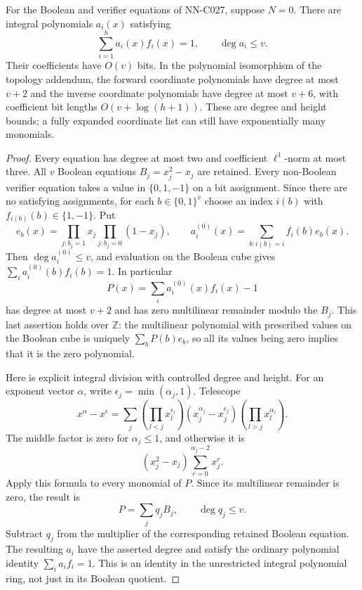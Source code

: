 \begin{proposition}
For the Boolean and verifier equations of NN-C027, suppose $N=0$.
There are integral polynomials $a_i(x)$ satisfying
\[
                      \sum_{i=1}^h a_i(x)f_i(x)=1,
 \qquad \deg a_i\leq v.
\]
Their coefficients have $O(v)$ bits. In the polynomial isomorphism
of the topology addendum, the forward coordinate polynomials have
degree at most $v+2$ and the inverse coordinate polynomials have
degree at most $v+6$, with coefficient bit lengths $O(v+\log(h+1))$.
These are degree and height bounds; a fully expanded coordinate
list can still have exponentially many monomials.
\end{proposition}

\begin{proof}
Every equation has degree at most two and coefficient $\ell^1$-norm
at most three. All $v$ Boolean equations $B_j=x_j^2-x_j$ are retained.
Every non-Boolean verifier equation takes a value in $\{0,1,-1\}$
on a bit assignment. Since there are no satisfying assignments,
for each $b\in\{0,1\}^v$ choose an index $i(b)$ with
$f_{i(b)}(b)\in\{1,-1\}$. Put
\[
 e_b(x)=\prod_{j:b_j=1}x_j\prod_{j:b_j=0}(1-x_j),
 \qquad
 a_i^{(0)}(x)=\sum_{b:i(b)=i}f_i(b)e_b(x).
\]
Then $\deg a_i^{(0)}\leq v$, and evaluation on the Boolean cube gives
$\sum_i a_i^{(0)}(b)f_i(b)=1$. In particular
\[
 P(x)=\sum_i a_i^{(0)}(x)f_i(x)-1
\]
has degree at most $v+2$ and has zero multilinear remainder modulo
the $B_j$. This last assertion holds over $\mathbb Z$: the
multilinear polynomial with prescribed values on the Boolean cube
is uniquely $\sum_b P(b)e_b$, so all its values being zero implies
that it is the zero polynomial.

Here is explicit integral division with controlled degree and
height. For an exponent vector $\alpha$, write
$\epsilon_j=\min(\alpha_j,1)$. Telescope
\[
 x^\alpha-x^\epsilon=
 \sum_j\left(\prod_{l<j}x_l^{\epsilon_l}\right)
       (x_j^{\alpha_j}-x_j^{\epsilon_j})
       \left(\prod_{l>j}x_l^{\alpha_l}\right).
\]
The middle factor is zero for $\alpha_j\leq1$, and otherwise it is
\[
        (x_j^2-x_j)\sum_{r=0}^{\alpha_j-2}x_j^r.
\]
Apply this formula to every monomial of $P$. Since its multilinear
remainder is zero, the result is
\[
                         P=\sum_j q_j B_j,
 \qquad \deg q_j\leq v.
\]
Subtract $q_j$ from the multiplier of the corresponding retained
Boolean equation. The resulting $a_i$ have the asserted degree
and satisfy the ordinary polynomial identity $\sum_i a_i f_i=1$.
This is an identity in the unrestricted integral polynomial ring,
not just in its Boolean quotient.


\end{proof}
